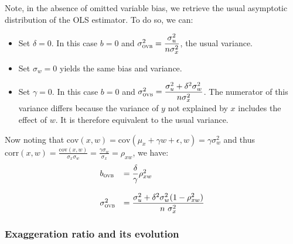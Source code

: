 \documentclass[a4paper, 11pt]{report}
\begin{document}
				Note, in the absence of omitted variable bias, we retrieve the usual asymptotic distribution of the OLS estimator. To do so, we can:
					
					\begin{itemize}
						\item Set $\delta = 0$. In this case $b = 0$ and $\sigma_{\textsc{ovb}}^{2} = \dfrac{\sigma_{u}^{2}}{n \sigma_{x}^{2}}$, the usual variance.
						\item Set $\sigma_{w} = 0$ yields the same bias and variance.
						\item Set $\gamma = 0$. In this case $b = 0$ and $\sigma_{\textsc{ovb}}^{2} = \dfrac{\sigma_{u}^{2} + \delta^{2}\sigma_{w}^{2}}{n \sigma_{x}^{2}}$. The numerator of this variance differs because the variance of $y$ not explained by $x$ includes the effect of $w$. It is therefore equivalent to the usual variance.\\
					\end{itemize}
					
					Now noting that $\text{cov}(x, w) = \text{cov}(\mu_{x} + \gamma w + \epsilon, w) = \gamma \sigma_{w}^{2}$ and thus $\text{corr}(x, w) = \frac{\text{cov}(x, w)}{\sigma_{x}\sigma_{w}} = \frac{\gamma\sigma_{w}}{\sigma_{x}} = \rho_{xw}$, we have:
					~
				\begin{equation}
					\begin{array}{lll}
						b_{\textsc{ovb}} & = \dfrac{\delta}{\gamma}\rho_{xw}^{2}\\~\\
						\sigma_{\textsc{ovb}}^{2} & = \dfrac{ \sigma_{u}^{2} +  \delta^{2} \sigma_{w}^{2} (1 - \rho_{xw}^{2})}{n \ \sigma_{x}^{2}} 
					\end{array}				
				\end{equation}
					
				
			\subsubsection{Exaggeration ratio and its evolution}
				
\end{document}
